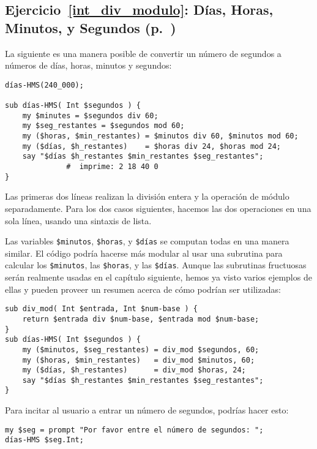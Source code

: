 \subsection{Ejercicio~\ref{int_div_modulo}: Días, Horas, Minutos, y Segundos (p.~\pageref{int_div_modulo})}
\label{sol_int_div_modulo}

La siguiente es una manera posible de convertir un número de
segundos a números de días, horas, minutos y segundos:


\begin{verbatim}
días-HMS(240_000);

sub días-HMS( Int $segundos ) {
    my $minutes = $segundos div 60;
    my $seg_restantes = $segundos mod 60;
    my ($horas, $min_restantes) = $minutos div 60, $minutos mod 60;
    my ($días, $h_restantes)    = $horas div 24, $horas mod 24;
    say "$días $h_restantes $min_restantes $seg_restantes"; 
              #  imprime: 2 18 40 0
}
\end{verbatim}

Las primeras dos líneas realizan la división entera y la
operación de módulo separadamente. Para los dos casos
siguientes, hacemos las dos operaciones en una sola línea, usando
una sintaxis de lista.

Las variables \verb|$minutos|, \verb|$horas|, y \verb|$días|
se computan todas en una manera similar. El código podría hacerse
más modular al usar una subrutina para calcular los \verb|$minutos|,
las \verb|$horas|, y las \verb|$días|. Aunque las subrutinas fructuosas
serán realmente usadas en el capítulo siguiente, hemos ya visto 
varios ejemplos de ellas y pueden proveer un resumen acerca de cómo
podrían ser utilizadas: 

\begin{verbatim}
sub div_mod( Int $entrada, Int $num-base ) {
    return $entrada div $num-base, $entrada mod $num-base;
}
sub días-HMS( Int $segundos ) {
    my ($minutos, $seg_restantes) = div_mod $segundos, 60;
    my ($horas, $min_restantes)   = div_mod $minutos, 60;
    my ($días, $h_restantes)      = div_mod $horas, 24;
    say "$días $h_restantes $min_restantes $seg_restantes"; 
}
\end{verbatim}

Para incitar al usuario a entrar un número de segundos,
podrías hacer esto:

\begin{verbatim}
my $seg = prompt "Por favor entre el número de segundos: ";
días-HMS $seg.Int;
\end{verbatim}

